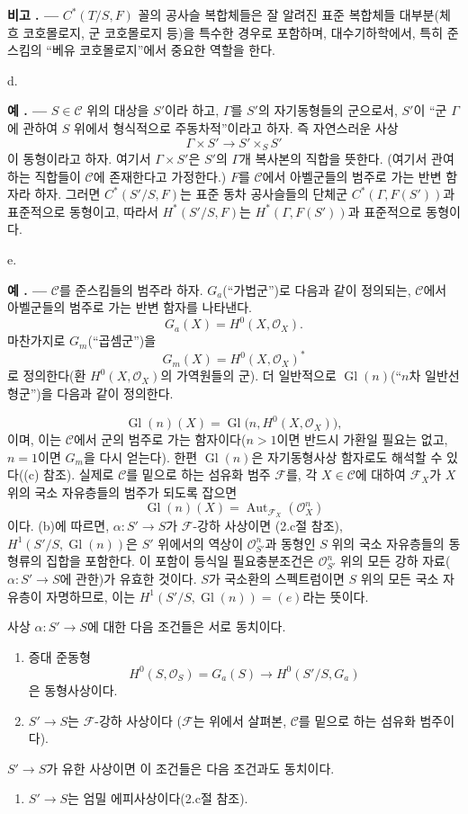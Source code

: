 \documentclass[11pt,twoside,openany]{book}
\numberwithin{equation}{section}
\newcommand{\sourceunit}{front}
\newcommand{\src}[1]{%
  \phantomsection\hypertarget{src:\sourceunit:#1}{}%
  \marginpar{\raggedleft\footnotesize\sffamily #1}%
}
\theoremstyle{plain}
\theoremstyle{definition}
\theoremstyle{remark}
\newcommand{\result}[2]{%
  \par\medskip\noindent\textbf{#1%
  \if\relax\detokenize{#2}\relax\else\space#2\fi. ---}\enspace
}
\begin{document}
\result{비고}{} $C^*(T/S,F)$ 꼴의 공사슬 복합체들은 잘 알려진 표준
복합체들 대부분(체흐 코호몰로지, 군 코호몰로지 등)을 특수한 경우로
포함하며, 대수기하학에서, 특히 준스킴의 ``베유 코호몰로지''에서 중요한
역할을 한다.

\medskip\noindent
d. \result{예}{1} $S\in\mathcal C$ 위의 대상을 $S'$이라 하고,
$\Gamma$를 $S'$의 자기동형들의 군으로서, $S'$이 ``군 $\Gamma$에 관하여
$S$ 위에서 형식적으로 주동차적''이라고 하자. 즉 자연스러운 사상
\[
  \Gamma\times S'\longrightarrow S'\times_SS'
\]
이 동형이라고 하자. 여기서 $\Gamma\times S'$은 $S'$의 $\Gamma$개
복사본의 직합을 뜻한다. (여기서 관여하는 직합들이 $\mathcal C$에
존재한다고 가정한다.) $F$를 $\mathcal C$에서 아벨군들의 범주로 가는
반변 함자라 하자. 그러면 $C^*(S'/S,F)$는 표준 동차 공사슬들의 단체군
$C^*(\Gamma,F(S'))$과 표준적으로 동형이고, 따라서 $H^*(S'/S,F)$는
$H^*(\Gamma,F(S'))$과 표준적으로 동형이다.

\medskip\noindent
e. \result{예}{2} $\mathcal C$를 준스킴들의 범주라 하자. $G_a$(``가법군'')로
다음과 같이 정의되는, $\mathcal C$에서 아벨군들의 범주로 가는 반변 함자를
나타낸다.
\[
  G_a(X)=H^0(X,\mathcal O_X).
\]
마찬가지로 $G_m$(``곱셈군'')을
\[
  G_m(X)=H^0(X,\mathcal O_X)^*
\]
로 정의한다(환 $H^0(X,\mathcal O_X)$의 가역원들의 군). 더 일반적으로
$\operatorname{Gl}(n)$(``$n$차 일반선형군'')을 다음과 같이 정의한다.

\src{313}
\[
  \operatorname{Gl}(n)(X)=
  \operatorname{Gl}\bigl(n,H^0(X,\mathcal O_X)\bigr),
\]
이며, 이는 $\mathcal C$에서 군의 범주로 가는 함자이다($n>1$이면
반드시 가환일 필요는 없고, $n=1$이면 $G_m$을 다시 얻는다). 한편
$\operatorname{Gl}(n)$은 자기동형사상 함자로도 해석할 수 있다((c) 참조).
실제로 $\mathcal C$를 밑으로 하는 섬유화 범주 $\mathcal F$를, 각
$X\in\mathcal C$에 대하여 $\mathcal F_X$가 $X$ 위의 국소 자유층들의
범주가 되도록 잡으면
\[
  \operatorname{Gl}(n)(X)=
  \operatorname{Aut}_{\mathcal F_X}(\mathcal O_X^n)
\]
이다.
(b)에 따르면, $\alpha:S'\longrightarrow S$가 $\mathcal F$-강하 사상이면
(2.c절 참조), $H^1(S'/S,\operatorname{Gl}(n))$은 $S'$ 위에서의 역상이
$\mathcal O_{S'}^n$과 동형인 $S$ 위의 국소 자유층들의 동형류의 집합을
포함한다. 이 포함이 등식일 필요충분조건은
$\mathcal O_{S'}^n$ 위의 모든 강하 자료($\alpha:S'\longrightarrow S$에
관한)가 유효한 것이다. $S$가 국소환의 스펙트럼이면 $S$ 위의 모든
국소 자유층이 자명하므로, 이는
$H^1(S'/S,\operatorname{Gl}(n))=(e)$라는 뜻이다.

사상 $\alpha:S'\longrightarrow S$에 대한 다음 조건들은 서로 동치이다.
\begin{enumerate}
\item[(i)] 증대 준동형
\[
  H^0(S,\mathcal O_S)=G_a(S)\longrightarrow H^0(S'/S,G_a)
\]
은 동형사상이다.
\item[(ii)] $S'\longrightarrow S$는 $\mathcal F$-강하 사상이다
($\mathcal F$는 위에서 살펴본, $\mathcal C$를 밑으로 하는 섬유화
범주이다).
\end{enumerate}
$S'\longrightarrow S$가 유한 사상이면 이 조건들은 다음 조건과도
동치이다.
\begin{enumerate}
\item[(iii)] $S'\longrightarrow S$는 엄밀 에피사상이다(2.c절 참조).
\end{enumerate}
\end{document}
